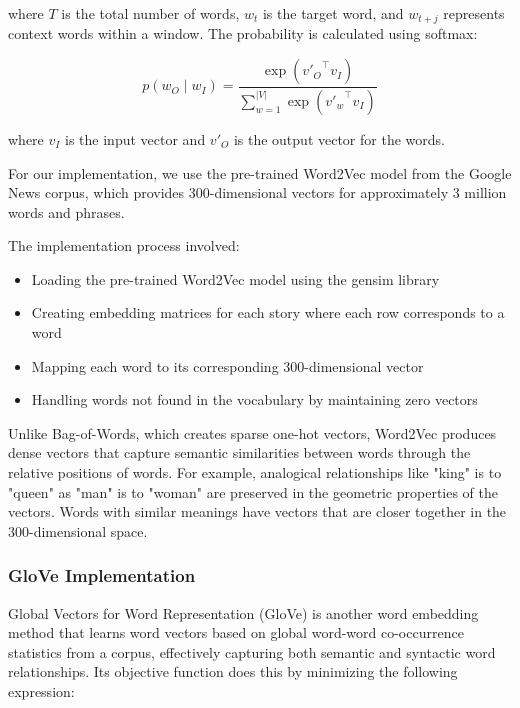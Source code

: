 \documentclass[12pt,letterpaper]{article}
\begin{document}
where $T$ is the total number of words, $w_t$ is the target word, and $w_{t+j}$ represents context words within a window. The probability is calculated using softmax: 

\begin{equation}
p(w_O \mid w_I) = \frac{\exp\left({v'_{O}}^\top v_{I}\right)}{\sum_{w=1}^{|V|} \exp\left({v'_{w}}^\top v_{I}\right)}
\end{equation}


where $v_I$ is the input vector and $v'_O$ is the output vector for the words.

For our implementation, we use the pre-trained Word2Vec model from the Google News corpus, which provides 300-dimensional vectors for approximately 3 million words and phrases.

The implementation process involved:

\begin{itemize}[itemsep=0.2cm]
    \item Loading the pre-trained Word2Vec model using the gensim library
    \item Creating embedding matrices for each story where each row corresponds to a word
    \item Mapping each word to its corresponding 300-dimensional vector
    \item Handling words not found in the vocabulary by maintaining zero vectors
\end{itemize}


Unlike Bag-of-Words, which creates sparse one-hot vectors, Word2Vec produces dense vectors that capture semantic similarities between words through the relative positions of words. For example, analogical relationships like "king" is to "queen" as "man" is to "woman" are preserved in the geometric properties of the vectors. Words with similar meanings have vectors that are closer together in the 300-dimensional space. 

\subsubsection {GloVe Implementation } 

Global Vectors for Word Representation (GloVe) is another word embedding method that learns word vectors based on global word-word co-occurrence statistics from a corpus, effectively capturing both semantic and syntactic word relationships. Its objective function does this by minimizing the following expression:
\end{document}
